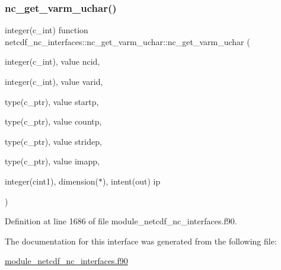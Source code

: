 \subsubsection{\texorpdfstring{nc\+\_\+get\+\_\+varm\+\_\+uchar()}{nc\_get\_varm\_uchar()}}
{\footnotesize\ttfamily integer(c\+\_\+int) function netcdf\+\_\+nc\+\_\+interfaces\+::nc\+\_\+get\+\_\+varm\+\_\+uchar\+::nc\+\_\+get\+\_\+varm\+\_\+uchar (\begin{DoxyParamCaption}\item[{integer(c\+\_\+int), value}]{ncid,  }\item[{integer(c\+\_\+int), value}]{varid,  }\item[{type(c\+\_\+ptr), value}]{startp,  }\item[{type(c\+\_\+ptr), value}]{countp,  }\item[{type(c\+\_\+ptr), value}]{stridep,  }\item[{type(c\+\_\+ptr), value}]{imapp,  }\item[{integer(cint1), dimension($\ast$), intent(out)}]{ip }\end{DoxyParamCaption})}



Definition at line 1686 of file module\+\_\+netcdf\+\_\+nc\+\_\+interfaces.\+f90.



The documentation for this interface was generated from the following file\+:\begin{DoxyCompactItemize}
\item 
\hyperlink{module__netcdf__nc__interfaces_8f90}{module\+\_\+netcdf\+\_\+nc\+\_\+interfaces.\+f90}\end{DoxyCompactItemize}
